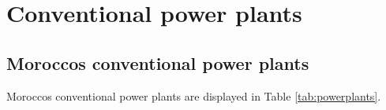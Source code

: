 
\section{Conventional power plants}
\subsection{Moroccos conventional power plants}
Moroccos conventional power plants are displayed in Table \ref{tab:powerplants}.

\clearpage
\begin{footnotesize}
    
\end{footnotesize}
\clearpage